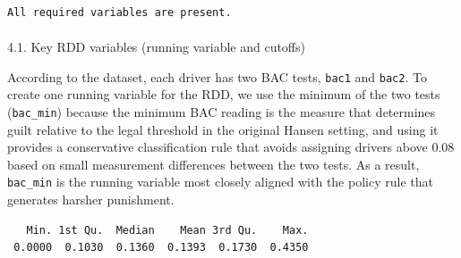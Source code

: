 \documentclass[
  letterpaper,
  DIV=11,
  numbers=noendperiod]{scrartcl}
\makeatletter
\let\oldparagraph\paragraph
\renewcommand{\paragraph}{
    \@ifstar
      \xxxParagraphStar
      \xxxParagraphNoStar
  }
\newcommand{\xxxParagraphStar}[1]{\oldparagraph*{#1}\mbox{}}
\newcommand{\xxxParagraphNoStar}[1]{\oldparagraph{#1}\mbox{}}
\newenvironment{Shaded}{\begin{snugshade}}{\end{snugshade}}
\newcommand{\AttributeTok}[1]{\textcolor[rgb]{0.40,0.45,0.13}{#1}}
\newcommand{\CommentTok}[1]{\textcolor[rgb]{0.37,0.37,0.37}{#1}}
\newcommand{\ConstantTok}[1]{\textcolor[rgb]{0.56,0.35,0.01}{#1}}
\newcommand{\FloatTok}[1]{\textcolor[rgb]{0.68,0.00,0.00}{#1}}
\newcommand{\FunctionTok}[1]{\textcolor[rgb]{0.28,0.35,0.67}{#1}}
\newcommand{\NormalTok}[1]{\textcolor[rgb]{0.00,0.23,0.31}{#1}}
\newcommand{\OtherTok}[1]{\textcolor[rgb]{0.00,0.23,0.31}{#1}}
\newcommand{\SpecialCharTok}[1]{\textcolor[rgb]{0.37,0.37,0.37}{#1}}
\newcommand{\StringTok}[1]{\textcolor[rgb]{0.13,0.47,0.30}{#1}}
\makeatother
\begin{document}
\begin{verbatim}
All required variables are present.
\end{verbatim}

\paragraph{4.1. Key RDD variables (running variable and
cutoffs)}\label{key-rdd-variables-running-variable-and-cutoffs}

According to the dataset, each driver has two BAC tests, \texttt{bac1}
and \texttt{bac2}. To create one running variable for the RDD, we use
the minimum of the two tests (\texttt{bac\_min}) because the minimum BAC
reading is the measure that determines guilt relative to the legal
threshold in the original Hansen setting, and using it provides a
conservative classification rule that avoids assigning drivers above
0.08 based on small measurement differences between the two tests. As a
result, \texttt{bac\_min} is the running variable most closely aligned
with the policy rule that generates harsher punishment.

\begin{Shaded}
\end{Shaded}

\begin{verbatim}
   Min. 1st Qu.  Median    Mean 3rd Qu.    Max. 
 0.0000  0.1030  0.1360  0.1393  0.1730  0.4350 
\end{verbatim}

\begin{Shaded}
\end{Shaded}
\end{document}
